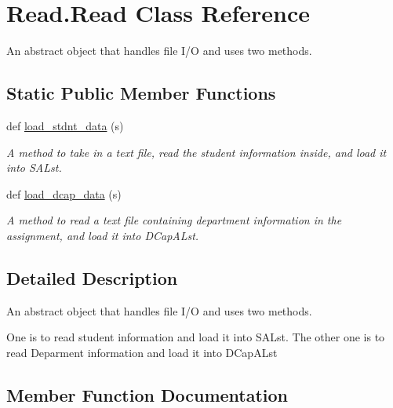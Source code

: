 \hypertarget{class_read_1_1_read}{}\section{Read.\+Read Class Reference}
\label{class_read_1_1_read}


An abstract object that handles file I/O and uses two methods.  


\subsection*{Static Public Member Functions}
\begin{DoxyCompactItemize}
\item 
def \mbox{\hyperlink{class_read_1_1_read_a36ee1b801e071f6095084eb68031f4bf}{load\+\_\+stdnt\+\_\+data}} (s)
\begin{DoxyCompactList}\small\item\em A method to take in a text file, read the student information inside, and load it into S\+A\+Lst. \end{DoxyCompactList}\item 
def \mbox{\hyperlink{class_read_1_1_read_ae485f030b6a773958fdf92845df93c31}{load\+\_\+dcap\+\_\+data}} (s)
\begin{DoxyCompactList}\small\item\em A method to read a text file containing department information in the assignment, and load it into D\+Cap\+A\+Lst. \end{DoxyCompactList}\end{DoxyCompactItemize}


\subsection{Detailed Description}
An abstract object that handles file I/O and uses two methods. 

One is to read student information and load it into S\+A\+Lst. The other one is to read Deparment information and load it into D\+Cap\+A\+Lst 

\subsection{Member Function Documentation}
\mbox{\label{class_read_1_1_read_ae485f030b6a773958fdf92845df93c31}} 
